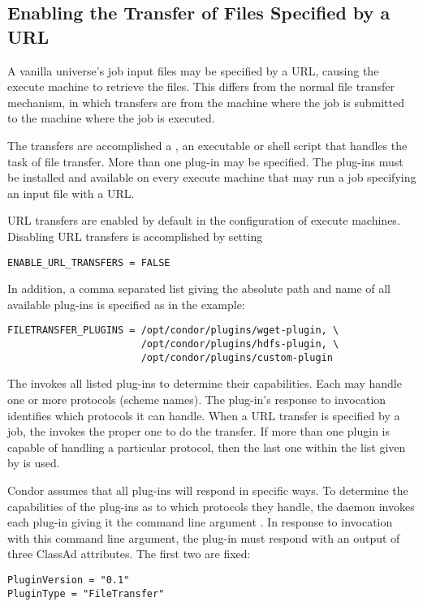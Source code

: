 \subsection{\label{sec:URL-transfer}
Enabling the Transfer of Files Specified by a URL}

A vanilla universe's job input files may be specified by a URL,
causing the execute machine to retrieve the files.
This differs from the normal file transfer mechanism,
in which transfers are from the machine where the job is submitted
to the machine where the job is executed.

The transfers are accomplished a ,
an executable or shell script that handles the task of file transfer.
More than one plug-in may be specified.
The plug-ins must be installed and available on every execute machine 
that may run a job specifying an input file with a URL.

URL transfers are enabled by default in the configuration 
of execute machines.
Disabling URL transfers is accomplished by setting
\footnotesize
\begin{verbatim}
ENABLE_URL_TRANSFERS = FALSE
\end{verbatim}
\normalsize

In addition, a comma separated list giving the absolute path and name
of all available plug-ins is specified as in the example:
\footnotesize
\begin{verbatim}
FILETRANSFER_PLUGINS = /opt/condor/plugins/wget-plugin, \
                       /opt/condor/plugins/hdfs-plugin, \
                       /opt/condor/plugins/custom-plugin
\end{verbatim}
\normalsize

The  invokes all listed plug-ins to determine their 
capabilities. Each may handle one or more protocols (scheme names).
The plug-in's response to invocation identifies which protocols
it can handle.
When a URL transfer is specified by a job,
the  invokes the proper one to do the transfer.
If more than one plugin is capable of handling a particular protocol,
then the last one within the list given by 
is used.

Condor assumes that all plug-ins will respond in specific
ways.
To determine the capabilities of the plug-ins as to which protocols
they handle,
the \Condor{starter} daemon invokes each plug-in giving it the
command line argument .
In response to invocation with this command line argument,
the plug-in must respond with an output of three ClassAd attributes. 
The first two are fixed:
\footnotesize
\begin{verbatim}
PluginVersion = "0.1"
PluginType = "FileTransfer"
\end{verbatim}
\normalsize

